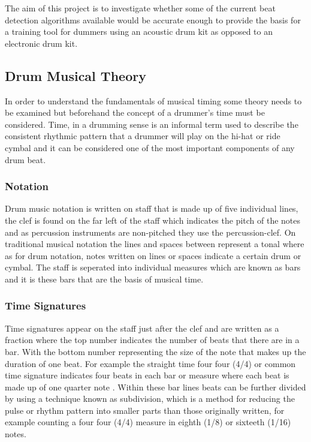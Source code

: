 \documentclass[a4paper, 11pt]{article}
\begin{document}
The aim of this project is to investigate whether some of the current beat detection algorithms available would be accurate enough to provide the basis for a training tool for dummers using an acoustic drum kit as opposed to an electronic drum kit. \par

\maketitle{} \subsection{Drum Musical Theory}
In order to understand the fundamentals of musical timing some theory needs to be examined but beforehand the concept of a drummer's time must be considered. Time, in a drumming sense is an informal term used to describe the consistent rhythmic pattern that a drummer will play on the hi-hat or ride cymbal \cite{drum-bible} and it can be considered one of the most important components of any drum beat. 

\maketitle{} \subsubsection{Notation}
Drum music notation is written on staff that is made up of five individual lines, the clef is found on the far left of the staff which indicates the pitch of the notes \cite{oxford-comp} and as percussion instruments are non-pitched they use the percussion-clef. On traditional musical notation the lines and spaces between represent a tonal where as for drum notation, notes written on lines or spaces indicate a certain drum or cymbal. The staff is seperated into individual measures which are known as bars \cite{drum-note} and it is these bars that are the basis of musical time. 

\maketitle{} \subsubsection{Time Signatures}
Time signatures appear on the staff just after the clef and are written as a fraction where the top number indicates the number of beats that there are in a bar. With the bottom number representing the size of the note that makes up the duration of one beat. For example the straight time four four (4/4) or common time signature indicates four beats in each bar or measure where each beat is made up of one quarter note \cite{drum-note}. Within these bar lines beats can be further divided by using a technique known as subdivision, which is a method for reducing the pulse or rhythm pattern into smaller parts than those originally written, for example counting a four four (4/4) measure in eighth (1/8) or sixteeth (1/16) notes. 
\end{document}
